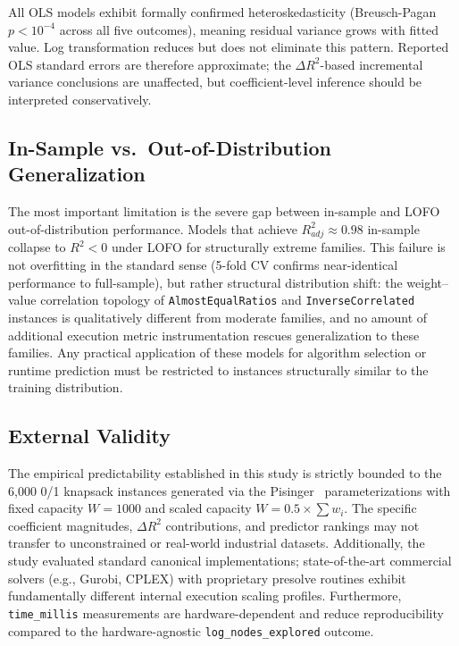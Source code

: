 \documentclass[sigconf]{acmart}
\begin{document}
All OLS models exhibit formally confirmed heteroskedasticity (Breusch-Pagan $p < 10^{-4}$ across all five outcomes), meaning residual variance grows with fitted value. Log transformation reduces but does not eliminate this pattern. Reported OLS standard errors are therefore approximate; the $\Delta R^2$-based incremental variance conclusions are unaffected, but coefficient-level inference should be interpreted conservatively.

\subsection{In-Sample vs.\ Out-of-Distribution Generalization}
The most important limitation is the severe gap between in-sample and LOFO out-of-distribution performance. Models that achieve $R^2_{adj} \approx 0.98$ in-sample collapse to $R^2 < 0$ under LOFO for structurally extreme families. This failure is not overfitting in the standard sense (5-fold CV confirms near-identical performance to full-sample), but rather structural distribution shift: the weight--value correlation topology of \texttt{AlmostEqualRatios} and \texttt{InverseCorrelated} instances is qualitatively different from moderate families, and no amount of additional execution metric instrumentation rescues generalization to these families. Any practical application of these models for algorithm selection or runtime prediction must be restricted to instances structurally similar to the training distribution.

\subsection{External Validity}
The empirical predictability established in this study is strictly bounded to the 6,000 0/1 knapsack instances generated via the Pisinger~\cite{Pisinger2005} parameterizations with fixed capacity $W = 1000$ and scaled capacity $W = 0.5 \times \sum w_i$. The specific coefficient magnitudes, $\Delta R^2$ contributions, and predictor rankings may not transfer to unconstrained or real-world industrial datasets. Additionally, the study evaluated standard canonical implementations; state-of-the-art commercial solvers (e.g., Gurobi, CPLEX) with proprietary presolve routines exhibit fundamentally different internal execution scaling profiles. Furthermore, \texttt{time\_millis} measurements are hardware-dependent and reduce reproducibility compared to the hardware-agnostic \texttt{log\_nodes\_explored} outcome.
\end{document}
